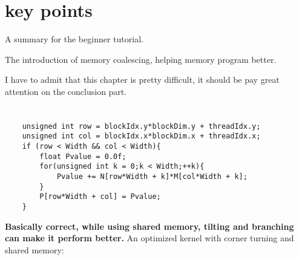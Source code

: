 \documentclass{article}
\begin{document}
\section*{key points}
A summary for the beginner tutorial.

The introduction of memory coalescing, helping memory program better.

I have to admit that this chapter is pretty difficult, it should be pay great attention on the conclusion part.
\section{}
\subsection{}
\begin{lstlisting}
    unsigned int row = blockIdx.y*blockDim.y + threadIdx.y;
    unsigned int col = blockIdx.x*blockDim.x + threadIdx.x;
    if (row < Width && col < Width){
        float Pvalue = 0.0f;
        for(unsigned int k = 0;k < Width;++k){
            Pvalue += N[row*Width + k]*M[col*Width + k];
        }
        P[row*Width + col] = Pvalue;
    }
\end{lstlisting}


\textbf{Basically correct, while using shared memory, tilting and branching can make it perform better.} An optimized kernel with corner turning and shared memory:
\end{document}
